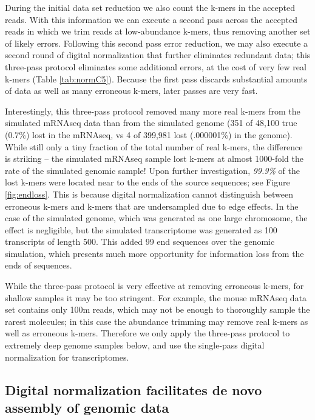 \documentclass[10pt]{article}
\begin{document}
During the initial data set reduction we also count the k-mers in the
accepted reads.  With this information we can execute a second pass
across the accepted reads in which we trim reads at low-abundance
k-mers, thus removing another set of likely errors.  Following this
second pass error reduction, we may also execute a second round of
digital normalization that further eliminates redundant data; this
three-pass protocol eliminates some additional errors, at the cost
of very few real k-mers (Table \ref{tab:normC5}).  Because the first
pass discards substantial amounts of data as well as many erroneous
k-mers, later passes are very fast.

Interestingly, this three-pass protocol removed many more real k-mers
from the simulated mRNAseq data than from the simulated genome (351 of
48,100 true (0.7\%) lost in the mRNAseq, vs 4 of 399,981 lost
(.000001\%) in the genome).  While still only a tiny fraction of the total number of
real k-mers, the difference is striking -- the simulated mRNAseq sample lost
k-mers at almost 1000-fold the rate of the simulated genomic sample!  Upon further
investigation, {\em 99.9\%} of the lost k-mers were located near to the
ends of the source sequences; see Figure \ref{fig:endloss}.  This is
because digital normalization cannot distinguish between erroneous
k-mers and k-mers that are undersampled due to edge effects.  In the
case of the simulated genome, which was generated as one large
chromosome, the effect is negligible, but the simulated transcriptome
was generated as 100 transcripts of length 500.  This added 99 end sequences
over the genomic simulation, which presents much
more opportunity for information loss from the ends of sequences.

While the three-pass protocol is very effective at removing erroneous k-mers,
for shallow samples it may be too stringent.  For example, the mouse
mRNAseq data set contains only 100m reads, which may not be enough to
thoroughly sample the rarest molecules; in this case the abundance trimming
may remove real k-mers as well as erroneous k-mers.  Therefore we only
apply the three-pass protocol to extremely deep genome samples below,
and use the single-pass digital normalization for transcriptomes.

\subsection*{Digital normalization facilitates de novo assembly of genomic data}
\end{document}
